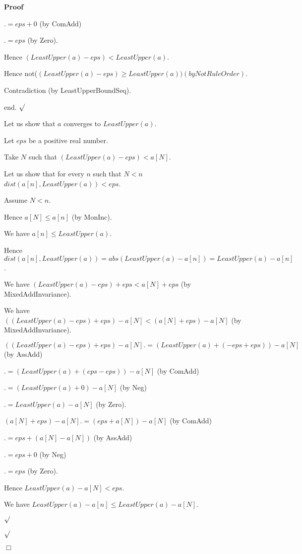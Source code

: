 \documentclass{article}
\newenvironment{forthel}{\begin{leftbar}}{\end{leftbar}}
\newenvironment{proof}{\noindent\textbf{Proof\ }}{\hspace*{\fill}$\Box$\medskip}
\newenvironment{subproof}{\begin{list}{}{}
		\item[\text{Proof}]}{\hfill $\surd$ \end{list}}
\begin{document}
\begin{forthel}
\begin{proof}
\begin{subproof}
			$.= eps + 0$ (by ComAdd)
			
			$.= eps$ (by Zero).
			
			Hence $(LeastUpper(a) - eps) < LeastUpper(a)$.
			
			Hence not($(LeastUpper(a) - eps) \geq LeastUpper(a)) (by NotRuleOrder)$.
			
			Contradiction (by LeastUpperBoundSeq).
			
			end.
		\end{subproof}
		
		Let us show that $a$ converges to $LeastUpper(a)$.
		
		\begin{subproof}
			Let $eps$ be a positive real number.
			
			Take $N$ such that $(LeastUpper(a) - eps) < a[N]$.
			
			Let us show that for every $n$ such that $N < n$ $dist(a[n],LeastUpper(a)) < eps$.
			
			\begin{subproof}
				Assume $N < n$.
				
				Hence $a[N] \leq a[n]$ (by MonInc).
				
				We have $a[n] \leq LeastUpper(a)$.
				
				Hence $dist(a[n],LeastUpper(a)) = abs(LeastUpper(a) - a[n]) = LeastUpper(a) - a[n]$.
				
				We have $(LeastUpper(a) - eps) + eps < a[N] + eps$ (by MixedAddInvariance).
				
				We have $((LeastUpper(a) - eps) + eps) - a[N] < (a[N] + eps) - a[N]$ (by MixedAddInvariance).
				
				$((LeastUpper(a) - eps) + eps) - a[N] .= (LeastUpper(a) + (-eps + eps)) - a[N]$ (by AssAdd)
				
				$.= (LeastUpper(a) + (eps - eps)) - a[N]$ (by ComAdd)
				
				$.= (LeastUpper(a) + 0) - a[N]$ (by Neg)
				
				$.= LeastUpper(a) - a[N]$ (by Zero).
				
				$(a[N] + eps) - a[N] .= (eps + a[N]) - a[N]$ (by ComAdd)
				
				$.= eps + (a[N] - a[N])$ (by AssAdd)
				
				$.= eps + 0$ (by Neg)
				
				$.= eps$ (by Zero).
				
				Hence $LeastUpper(a) - a[N] < eps$.
				
				We have $LeastUpper(a) - a[n] \leq LeastUpper(a) - a[N]$.
				

\end{subproof}
\end{subproof}
\end{proof}
\end{forthel}
\end{document}
